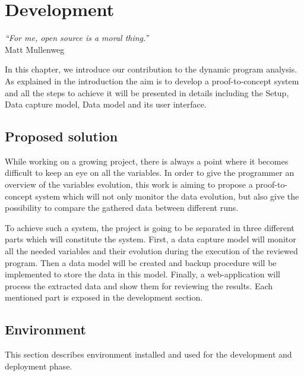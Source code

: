 

\chapter{Development} %
\label{chap:development}
\begin{flushright}
\textit{``For me, open source is a moral thing.''} \\ Matt Mullenweg
\end{flushright}

In this chapter, we introduce our contribution to the dynamic program analysis. As explained in the introduction the aim is to develop a proof-to-concept system and all the steps to achieve it will be presented in details including the Setup, Data capture model, Data model and its user interface.


\section{Proposed solution}
While working on a growing project, there is always a point where it becomes difficult to keep an eye on all the variables. In order to give the programmer an overview of the variables evolution, this work is aiming to propose a proof-to-concept system which will not only monitor the data evolution, but also give the possibility to compare the gathered data between different runs.

To achieve such a system, the project is going to be separated in three different parts which will constitute the system. First, a data capture model will monitor all the needed variables and their evolution during the execution of the reviewed program. Then a data model will be created and backup procedure will be implemented to store the data in this model. Finally, a web-application will process the extracted data and show them for reviewing the results. Each mentioned part is exposed in the development section.

\section{Environment}
This section describes environment installed and used for the development and deployment phase. 

